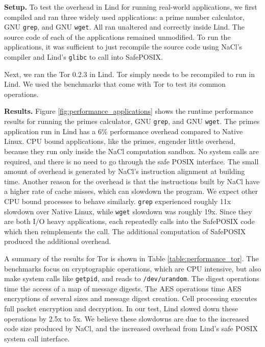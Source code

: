 {{{\noindent
\textbf{Setup.}
To test the overhead in Lind for running real-world applications, 
we first compiled and ran three widely used applications:
a prime number calculator, GNU \texttt{grep}, and GNU \texttt{wget}. All ran unaltered and
correctly inside Lind. The source code of each of the applications remained
unmodified. To run the applications, it was sufficient to just recompile the
source code using NaCl's compiler and Lind's \texttt{glibc} to call
into SafePOSIX.

Next, we ran the Tor 0.2.3 in Lind. Tor simply
needs to be recompiled to run in Lind.
We used the benchmarks that come with Tor to test its common operations.

\noindent
\textbf{Results.}
Figure \ref{fig:performance_applications} shows the runtime performance
results for running the primes calculator, GNU \texttt{grep}, and GNU \texttt{wget}. 
The primes application run in Lind has a 6\% performance overhead compared to
Native Linux. CPU bound applications, like the primes, engender little overhead,
because they run only inside the NaCl computation sandbox. No system calls are required,
and there is no need to go through the safe POSIX interface. The small amount of overhead
is generated by NaCl's instruction alignment at building time. Another reason for the overhead
is that the instructions built by NaCl have a higher rate of cache misses, which can slowdown the
program.
We expect other CPU bound processes to behave similarly.
\texttt{grep} experienced roughly 11x slowdown over Native Linux, while \texttt{wget}
slowdown was roughly 19x. Since they are both I/O heavy applications,
each repeatedly calls into the SafePOSIX code which then reimplements
the call.  The additional computation of SafePOSIX produced the additional
overhead. 

A summary of the results for Tor is shown in Table \ref{table:performance_tor}. The
benchmarks focus on cryptographic operations,
which are CPU intensive, but also make system calls like \texttt{getpid}, and reads to
\texttt{/dev/urandom}.
The digest operations time the access of a map of message digests.
The AES operations time AES encryptions of several sizes and message
digest creation.
Cell processing executes full packet encryption and decryption. In our
test, Lind slowed down these operations by 2.5x to 5x. We believe these
slowdowns are due to the increased code size produced by NaCl,
and the increased overhead from Lind's safe POSIX system call interface.

}}}
